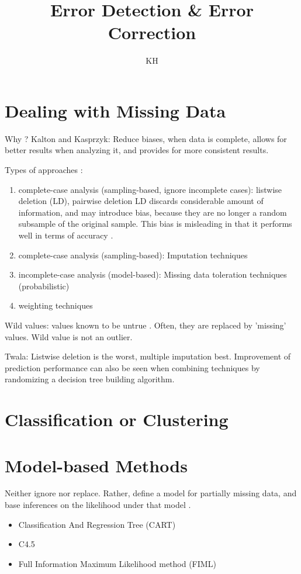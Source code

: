 \documentclass{article}
\begin{document}
\title{Error Detection \& Error Correction}
\author{KH}

\maketitle


\section*{Dealing with Missing Data}
Why ? Kalton and Kasprzyk: Reduce biases, when data is complete, allows for better results when analyzing it, and provides for more consistent results.\cite{poni}

Types of approaches \cite{wu}:
\begin{enumerate}
	\item complete-case analysis (sampling-based, ignore incomplete cases): listwise deletion (LD), pairwise deletion
	LD discards considerable amount of information, and may introduce bias, because they are no longer a random subsample of the original sample. This bias is misleading in that it performs well in terms of accuracy \cite{myrt}.
	\item complete-case analysis (sampling-based): Imputation techniques
	\item incomplete-case analysis (model-based): Missing data toleration techniques (probabilistic)
	\item weighting techniques \cite{myrt}
\end{enumerate}

Wild values: values known to be untrue \cite{myrt}. Often, they are replaced by 'missing' values. Wild value is not an outlier.


Twala: Listwise deletion is the worst, multiple imputation best. Improvement of prediction performance can also be seen when combining techniques by randomizing a decision tree building algorithm. 

\section{Classification or Clustering}
\section{Model-based Methods}
Neither ignore nor replace. Rather, define a model for partially missing data, and base inferences on the likelihood under that model \cite{myrt}. 
	\begin{itemize}
		\item Classification And Regression Tree (CART)
		\item C4.5
		\item Full Information Maximum Likelihood method (FIML) \cite{myrt}
	\end{itemize}
\end{document}
